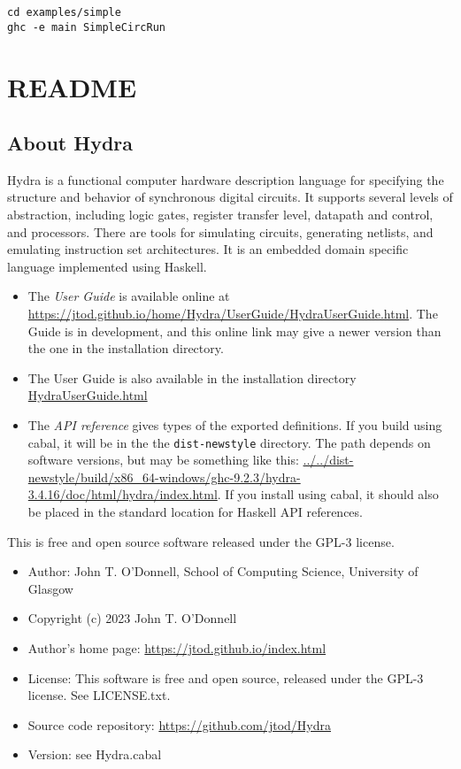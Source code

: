 \documentclass[11pt]{article}
\begin{document}
\begin{verbatim}
cd examples/simple
ghc -e main SimpleCircRun
\end{verbatim}


\section{README}
\label{sec:orgdf2b36c}


\subsection{About Hydra}
\label{sec:org0525b7b}

Hydra is a functional computer hardware description language for
specifying the structure and behavior of synchronous digital
circuits. It supports several levels of abstraction, including logic
gates, register transfer level, datapath and control, and
processors. There are tools for simulating circuits, generating
netlists, and emulating instruction set architectures. It is an
embedded domain specific  language implemented using Haskell.

\begin{itemize}
\item The \emph{User Guide} is available online at
\url{https://jtod.github.io/home/Hydra/UserGuide/HydraUserGuide.html}.
The Guide is in development, and this online link may give a newer
version than the one in the installation directory.
\item The User Guide is also available in the installation directory
\url{HydraUserGuide.html}
\item The \emph{API reference} gives types of the exported definitions.  If you
build using cabal, it will be in the the \texttt{dist-newstyle} directory.
The path depends on software versions, but may be something like
this:
\url{../../dist-newstyle/build/x86\_64-windows/ghc-9.2.3/hydra-3.4.16/doc/html/hydra/index.html}.
If you install using cabal, it should also be placed in the standard
location for Haskell API references.
\end{itemize}

This is free and open source software released under the GPL-3
license.

\begin{itemize}
\item Author: John T. O'Donnell, School of Computing Science, University
of Glasgow
\item Copyright (c) 2023 John T. O'Donnell
\item Author's home page: \url{https://jtod.github.io/index.html}
\item License: This software is free and open source, released under the
GPL-3 license.  See LICENSE.txt.
\item Source code repository: \url{https://github.com/jtod/Hydra}
\item Version: see Hydra.cabal
\end{itemize}
\end{document}
